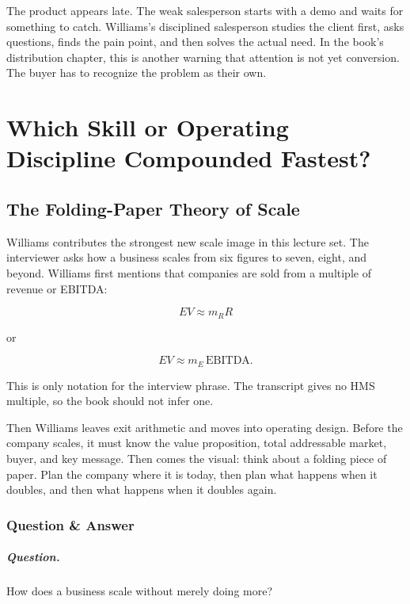 \documentclass[11pt,oneside]{book}
\begin{document}
The product appears late. The weak salesperson starts with a demo and waits for something to catch. Williams's disciplined salesperson studies the client first, asks questions, finds the pain point, and then solves the actual need. In the book's distribution chapter, this is another warning that attention is not yet conversion. The buyer has to recognize the problem as their own.

\chapter{Which Skill or Operating Discipline Compounded Fastest?}

\section{The Folding-Paper Theory of Scale}

Williams contributes the strongest new scale image in this lecture set. The interviewer asks how a business scales from six figures to seven, eight, and beyond. Williams first mentions that companies are sold from a multiple of revenue or EBITDA:

\begin{equation}
EV \approx m_R R
\end{equation}

or

\begin{equation}
EV \approx m_E\,\mathrm{EBITDA}.
\end{equation}

This is only notation for the interview phrase. The transcript gives no HMS multiple, so the book should not infer one.

Then Williams leaves exit arithmetic and moves into operating design. Before the company scales, it must know the value proposition, total addressable market, buyer, and key message. Then comes the visual: think about a folding piece of paper. Plan the company where it is today, then plan what happens when it doubles, and then what happens when it doubles again.

\subsection{Question \& Answer}

\paragraph{Question.}
How does a business scale without merely doing more?
\end{document}
